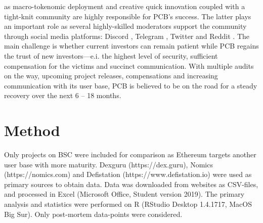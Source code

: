 \documentclass[12pt]{article}
\begin{document}
as macro-tokenomic deployment and creative quick innovation coupled with a tight-knit community are highly responsible for PCB’s success. 
The latter plays an important role as several highly-skilled moderators support the community through social media platforms: Discord \cite{bunny_discord}, Telegram \cite{bunny_tg}, Twitter \cite{bunny_twitter} and Reddit \cite{bunny_reddit}. The main challenge is whether current investors can remain patient while PCB regains the trust of new investors—e.i. the highest level of security, sufficient compensation for the victims and succinct communication. With multiple audits on the way, upcoming project releases, compensations 
and increasing communication with its user base, PCB is believed to be on the road for a steady recovery over the next 6 – 18 months.


\section*{Method}
Only projects on BSC were included for comparison as Ethereum targets another user base with more maturity. 
Dexguru (https://dex.guru), Nomics (https://nomics.com) and Defistation (https://www.defistation.io) were used 
as primary sources to obtain data. Data was downloaded from websites as CSV-files, and processed in Excel 
(Microsoft Office, Student version 2019). The primary analysis and statistics were performed on R (RStudio Desktop 
1.4.1717, MacOS Big Sur). Only post-mortem data-points were considered.
\end{document}
